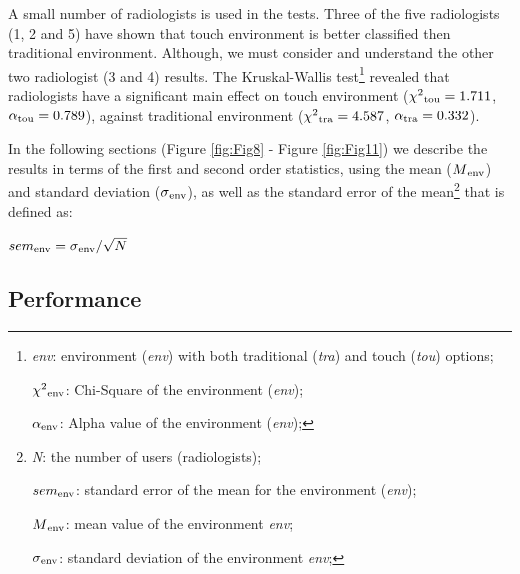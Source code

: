 \documentclass{chi-ext}
\begin{document}
A small number of radiologists is used in the tests. Three of the five radiologists (1, 2 and 5) have shown that touch environment is better classified then traditional environment. Although, we must consider and understand the other two radiologist (3 and 4) results. The Kruskal-Wallis test\footnote{
\textit{env}: environment (\textit{env}) with both traditional (\textit{tra}) and touch (\textit{tou}) options;

$\chi^2\textsubscript{env}$: Chi-Square of the environment (\textit{env});

$\alpha\textsubscript{env}$: Alpha value of the environment (\textit{env});
} revealed that radiologists have a significant main effect on touch environment ($\chi^2\textsubscript{tou} = 1.711$, $\alpha\textsubscript{tou} = 0.789$), against traditional environment ($\chi^2\textsubscript{tra} = 4.587$, $\alpha\textsubscript{tra} = 0.332$).

In the following sections (Figure \ref{fig:Fig8} - Figure \ref{fig:Fig11}) we describe the results in terms of the first and second order statistics, using the mean ($M\textsubscript{env}$) and standard deviation ($\sigma\textsubscript{env}$), as well as the standard error of the mean\footnote{
\textit{N}: the number of users (radiologists);

$sem\textsubscript{env}$: standard error of the mean for the environment (\textit{env});

$M\textsubscript{env}$: mean value of the environment \textit{env};

$\sigma\textsubscript{env}$: standard deviation of the environment \textit{env};
} that is defined as:

\begin{center}
$sem\textsubscript{env} = \sigma\textsubscript{env}/\sqrt{N}$
\end{center}

\subsection{Performance}
\end{document}

